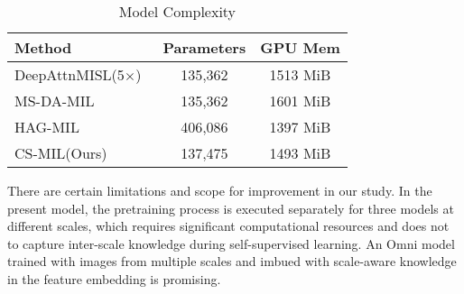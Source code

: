 \documentclass[times,twocolumn,final]{elsarticle}
\begin{document}
\begin{table}
\centering
\scriptsize
\caption{Model Complexity}
\begin{tabular}{l|cc}
\toprule
Method & Parameters & GPU Mem\\
\midrule
DeepAttnMISL(5$\times$)~\citep{yao2020whole} & 135,362 & 1513 MiB\\
\midrule
MS-DA-MIL~\citep{Hashimoto_2020_CVPR} & 135,362 & 1601 MiB\\
HAG-MIL~\citep{xiong2023diagnose} & 406,086 & 1397 MiB\\
\midrule
CS-MIL(Ours) & 137,475 & 1493 MiB\\

\bottomrule
\end{tabular}
\label{tab:ablation4}
\end{table}




There are certain limitations and scope for improvement in our study. In the present model, the pretraining process is executed separately for three models at different scales, which requires significant computational resources and does not to capture inter-scale knowledge during self-supervised learning. An Omni model trained with images from multiple scales and imbued with scale-aware knowledge in the feature embedding is promising.
\end{document}
